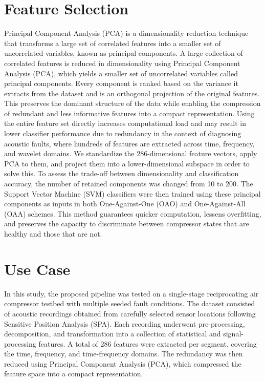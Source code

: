 \documentclass[12pt,a4paper]{article}
\begin{document}
\begin{multicols}{2}
\section{Feature Selection}
\label{sec:features}
Principal Component Analysis (PCA) is a dimensionality reduction technique that transforms a large set of correlated features into a smaller set of uncorrelated variables, known as principal components. A large collection of correlated features is reduced in dimensionality using Principal Component Analysis (PCA), which yields a smaller set of uncorrelated variables called principal components. Every component is ranked based on the variance it extracts from the dataset and is an orthogonal projection of the original features. This preserves the dominant structure of the data while enabling the compression of redundant and less informative features into a compact representation.
Using the entire feature set directly increases computational load and may result in lower classifier performance due to redundancy in the context of diagnosing acoustic faults, where hundreds of features are extracted across time, frequency, and wavelet domains.  We standardize the $286$-dimensional feature vectors, apply PCA to them, and project them into a lower-dimensional subspace in order to solve this.
 To assess the trade-off between dimensionality and classification accuracy, the number of retained components was changed from 10 to 200.  The Support Vector Machine (SVM) classifiers were then trained using these principal components as inputs in both One-Against-One (OAO) and One-Against-All (OAA) schemes.  This method guarantees quicker computation, lessens overfitting, and preserves the capacity to discriminate between compressor states that are healthy and those that are not.
\section{Use Case}

In this study, the proposed pipeline was tested on a single-stage reciprocating air compressor testbed with multiple seeded fault conditions.  The dataset consisted of acoustic recordings obtained from carefully selected sensor locations following Sensitive Position Analysis (SPA).  Each recording underwent pre-processing, decomposition, and transformation into a collection of statistical and signal-processing features.  A total of 286 features were extracted per segment, covering the time, frequency, and time-frequency domains.  The redundancy was then reduced using Principal Component Analysis (PCA), which compressed the feature space into a compact representation. 


\end{multicols}
\end{document}
